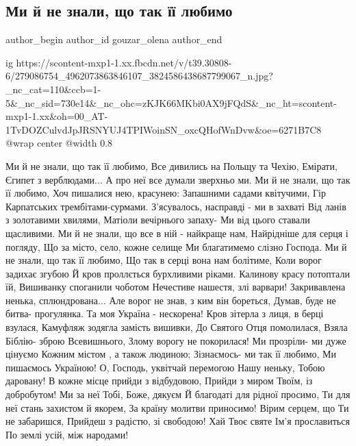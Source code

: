  
 
 
 
 
 
\subsection{Ми й не знали, що так її любимо}
\label{sec:26_04_2022.fb.gouzar_olena.1.ne_znaly_scho_tak_ii_ljubymo}
 
\ifcmt
 author_begin
   author_id gouzar_olena
 author_end
\fi


\ifcmt
  ig https://scontent-mxp1-1.xx.fbcdn.net/v/t39.30808-6/279086754_4962073863846107_3824586438687799067_n.jpg?_nc_cat=110&ccb=1-5&_nc_sid=730e14&_nc_ohc=zKJK66MKbi0AX9jFQdS&_nc_ht=scontent-mxp1-1.xx&oh=00_AT-1TvDOZCulvdJpJRSNYUJ4TPIWoinSN_oxcQHofWnDvw&oe=6271B7C8
  @wrap center
  @width 0.8
\fi

\raggedcolumns
\begin{multicols}{3} %
\setlength{\parindent}{0pt}

\obeycr
Ми й не знали, що так її любимо,
Все дивились на Польщу та Чехію,
Емірати, Єгипет з верблюдами...
А про неї все думали зверхньо ми.
\smallskip
Ми й не знали, що так її любимо,
Хоч пишалися нею, красунею:
Запашними садами квітучими,
Гір Карпатських трембітами-сурмами.
\smallskip
З'ясувалось, насправді - ми в захваті
Від ланів з золотавими хвилями,
Матіоли вечірнього запаху-
Ми від цього ставали щасливими.
\smallskip
Ми й не знали, що все в ній - найкраще нам,
Найрідніше для серця і погляду,
Що за місто, село, кожне селище
Ми благатимемо слізно Господа.
\smallskip
Ми й не знали, що так її любимо,
Що так в серці вона нам болітиме,
Коли ворог задихає згубою
Й кров проллється бурхливими ріками.
\smallskip
Калинову красу потоптали їй,
Вишиванку споганили чоботом
Нечестиве нашестя, злі варвари!
Закривавлена ненька, сплюндрована...
\smallskip
Але ворог не знав, з ким він бореться,
Думав, буде не битва- прогулянка.
Та моя Україна - нескорена!
\smallskip
Кров зітерла з лиця, в берці взулася,
Камуфляж зодягла замість вишивки,
До Святого Отця помолилася,
Взяла Біблію- зброю Всевишнього,
Злому ворогу не покорилася!
\smallskip
Ми прозріли- ми дуже цінуємо
Кожним містом , а також людиною;
Зізнаємось- ми так її любимо,
Ми пишаємось Україною!
\smallskip
О, Господь, уквітчай перемогою
Нашу неньку, Тобою даровану!
В кожне місце прийди з відбудовою,
Прийди з миром Твоїм, із добробутом!
\smallskip
Ми за неї Тобі, Боже, дякуєм
Й благодаті для рідної просимо,
Ти для неї стань захистом й якорем,
За країну молитви приносимо!
\smallskip
Вірим серцем, що Ти не забаришся,
Прийдеш з радістю, зі свободою!
Хай Твоє святе Ім'я прославиться
По землі усій, між народами!
\restorecr

\end{multicols} %
